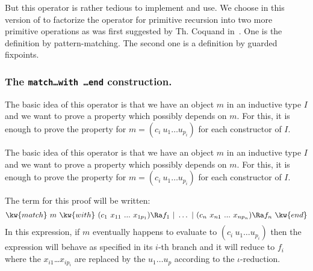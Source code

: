 But this operator is rather tedious to implement and use. We choose in
this version of {\Coq} to factorize the operator for primitive recursion
into two more primitive operations as was first suggested by Th. Coquand
in~\cite{Coq92}.  One is the definition by pattern-matching. The second one is a definition by guarded fixpoints. 

\subsubsection[The {\tt match\ldots with \ldots end} construction.]{The {\tt match\ldots with \ldots end} construction.\label{Caseexpr}
}

The basic idea of this operator is that we have an object
$m$ in an inductive type $I$ and we want to prove a property
which possibly depends on $m$. For this, it is enough to prove the
property for $m = (c_i~u_1\ldots  u_{p_i})$ for each constructor of $I$.


The basic idea of this operator is that we have an object
$m$ in an inductive type $I$ and we want to prove a property
which possibly depends on $m$. For this, it is enough to prove the
property for $m = (c_i~u_1\ldots  u_{p_i})$ for each constructor of $I$.

The \Coq{} term for this proof will be written:
\[\kw{match}~m~\kw{with}~ (c_1~x_{11}~...~x_{1p_1}) \Ra f_1 ~|~\ldots~|~
  (c_n~x_{n1}~...~x_{np_n}) \Ra f_n~ \kw{end}\]
In this expression, if
$m$ eventually happens to evaluate to $(c_i~u_1\ldots u_{p_i})$ then
the expression will behave as specified in its $i$-th branch and
it will reduce to $f_i$ where the $x_{i1}$\ldots $x_{ip_i}$ are replaced
by the $u_1\ldots u_p$ according to the $\iota$-reduction.

